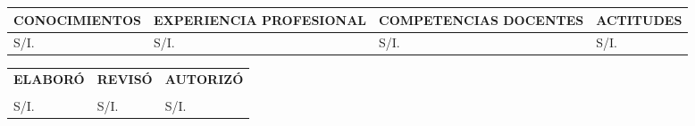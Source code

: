 \documentclass[10pt]{article}
\begin{document}
\begin{enumerate}
    \begin{tabular}{|p{}|p{}|p{}|p{}|}
      \hline
      \textbf{CONOCIMIENTOS} & \textbf{EXPERIENCIA PROFESIONAL} &\textbf{COMPETENCIAS DOCENTES} & \textbf{ACTITUDES}
      \\\hline
      S/I. 
      & 
      S/I.  
      &
      S/I. 
      & 
      S/I.
      \\\hline
    \end{tabular}
\end{enumerate}

  \begin{tabular}{p{}p{}p{}}

      \centering
      \textbf{ELABORÓ} 
      &
      \centering
      \textbf{REVISÓ} 
      &
      \centering
      \textbf{AUTORIZÓ}\\
      &&&\\

      \centering
      \hline 
      S/I.
      &
      \centering
      \hline 
      S/I.
      &
      \centering
      \hline 
       S/I.
  \end{tabular}
\end{document}
